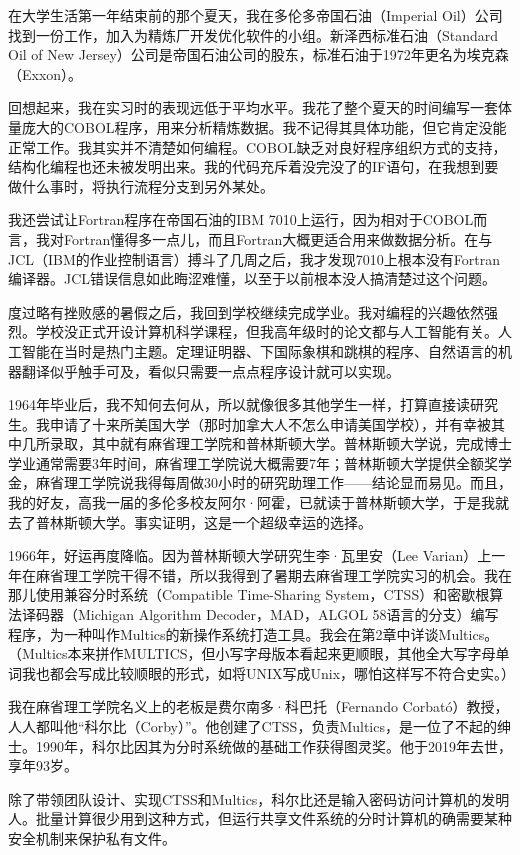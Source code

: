 \documentclass[a4paper,12pt,UTF8,twoside]{ctexbook}
\begin{document}
在大学生活第一年结束前的那个夏天，我在多伦多帝国石油（Imperial Oil）公司找到一份工作，加入为精炼厂开发优化软件的小组。新泽西标准石油（Standard Oil of New Jersey）公司是帝国石油公司的股东，标准石油于1972年更名为埃克森（Exxon）。

回想起来，我在实习时的表现远低于平均水平。我花了整个夏天的时间编写一套体量庞大的COBOL程序，用来分析精炼数据。我不记得其具体功能，但它肯定没能正常工作。我其实并不清楚如何编程。COBOL缺乏对良好程序组织方式的支持，结构化编程也还未被发明出来。我的代码充斥着没完没了的IF语句，在我想到要做什么事时，将执行流程分支到另外某处。

我还尝试让Fortran程序在帝国石油的IBM 7010上运行，因为相对于COBOL而言，我对Fortran懂得多一点儿，而且Fortran大概更适合用来做数据分析。在与JCL（IBM的作业控制语言）搏斗了几周之后，我才发现7010上根本没有Fortran编译器。JCL错误信息如此晦涩难懂，以至于以前根本没人搞清楚过这个问题。

度过略有挫败感的暑假之后，我回到学校继续完成学业。我对编程的兴趣依然强烈。学校没正式开设计算机科学课程，但我高年级时的论文都与人工智能有关。人工智能在当时是热门主题。定理证明器、下国际象棋和跳棋的程序、自然语言的机器翻译似乎触手可及，看似只需要一点点程序设计就可以实现。

1964年毕业后，我不知何去何从，所以就像很多其他学生一样，打算直接读研究生。我申请了十来所美国大学（那时加拿大人不怎么申请美国学校），并有幸被其中几所录取，其中就有麻省理工学院和普林斯顿大学。普林斯顿大学说，完成博士学业通常需要3年时间，麻省理工学院说大概需要7年；普林斯顿大学提供全额奖学金，麻省理工学院说我得每周做30小时的研究助理工作——结论显而易见。而且，我的好友，高我一届的多伦多校友阿尔·阿霍，已就读于普林斯顿大学，于是我就去了普林斯顿大学。事实证明，这是一个超级幸运的选择。

1966年，好运再度降临。因为普林斯顿大学研究生李·瓦里安（Lee Varian）上一年在麻省理工学院干得不错，所以我得到了暑期去麻省理工学院实习的机会。我在那儿使用兼容分时系统（Compatible Time-Sharing System，CTSS）和密歇根算法译码器（Michigan Algorithm Decoder，MAD，ALGOL 58语言的分支）编写程序，为一种叫作Multics的新操作系统打造工具。我会在第2章中详谈Multics。（Multics本来拼作MULTICS，但小写字母版本看起来更顺眼，其他全大写字母单词我也都会写成比较顺眼的形式，如将UNIX写成Unix，哪怕这样写不符合史实。）

我在麻省理工学院名义上的老板是费尔南多·科巴托（Fernando Corbató）教授，人人都叫他“科尔比（Corby）”。他创建了CTSS，负责Multics，是一位了不起的绅士。1990年，科尔比因其为分时系统做的基础工作获得图灵奖。他于2019年去世，享年93岁。

除了带领团队设计、实现CTSS和Multics，科尔比还是输入密码访问计算机的发明人。批量计算很少用到这种方式，但运行共享文件系统的分时计算机的确需要某种安全机制来保护私有文件。
\end{document}
